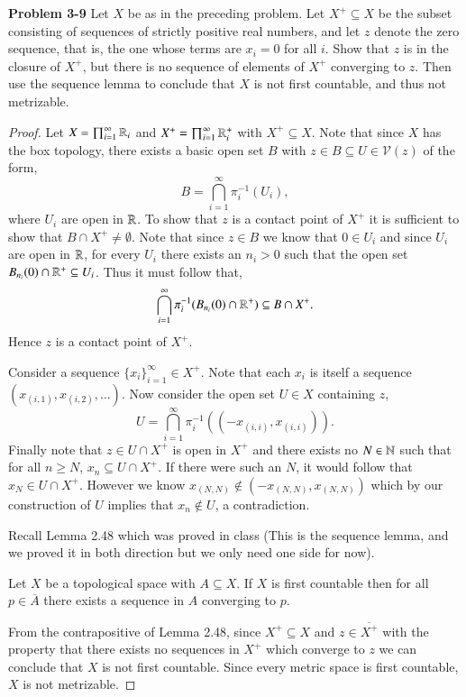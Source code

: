 \documentclass[minion]{homework651}
\begin{document}
\begin{problems}
\problem\textbf{Problem 3-9} Let $X$ be as in the preceding problem. Let $X^+\subseteq X$ be the subset consisting of sequences of 
strictly positive real numbers, and let $z$ denote the zero sequence, that is, the one whose terms are $x_i = 0$ for all $i$. 
Show that $z$ is in the closure of $X^+$, but there is no sequence of elements of $X^+$ converging to $z$. Then use the sequence lemma to conclude that $X$
is not first countable, and thus not metrizable.  
\begin{proof}  Let $X = \prod_{i = 1}^\infty \mathbb R_i$ and $X^+ = \prod_{i = 1}^\infty \mathbb R^+_i$ with $X^+\subseteq X$. Note that since $X$ has the box topology,
    there exists a basic open set $B$ with $z \in B \subseteq U \in \mathcal{V}(z)$ of the form, 
    \begin{equation*}
        B = \bigcap_{i = 1}^\infty \pi^{-1}_i(U_i),
    \end{equation*}
    where $U_i$ are open in $\mathbb R$. To show that $z$ is a contact point of $X^+$ it is sufficient to show that $B \cap X^+ \neq \emptyset$. 
    Note that since $z \in B$ we know that $0 \in U_i$ and since $U_i$ are open in $\mathbb R$, for every $U_i$ there exists an $n_{i} > 0$ such that the open set $B_{n_{i}}(0)\cap \mathbb R^+ \subseteq U_i$.
    Thus it must follow that, 
    \begin{equation*}
        \bigcap_{i = 1}^{\infty}\pi^{-1}_i(B_{n_i}(0) \cap \mathbb R^+) \subseteq B \cap X^+.
    \end{equation*}
    Hence $z$ is a contact point of $X^+$. 

    
    Consider a sequence $\{x_i\}_{i = 1}^\infty \in X^+$. Note that each $x_i$ is itself a sequence $(x_{(i,1)},x_{(i,2)}, \dots)$.
    Now consider the open set $U \in X$ containing $z$, 
    \begin{equation*}
        U = \bigcap_{i = 1}^{\infty}\pi_i^{-1}((-x_{(i,i)}, x_{(i,i)})).
    \end{equation*}
    Finally note that $z \in U \cap X^+$ is open in $X^+$ and there exists no $N \in \mathbb N$ such that for all $n \geq N$, $x_n \subseteq U\cap X^+$. 
    If there were such an $N$, it would follow that $x_N \in U \cap X^+$. However we know $x_{(N, N)} \not\in (-x_{(N, N)}, x_{(N, N)})$ which by our construction of $U$ implies that 
    $x_n \not \in U$, a contradiction.  

    Recall Lemma 2.48 which was proved in class (This is the sequence lemma, and we proved it in both direction but we only need one side for now). 
    \begin{lemma}{2.48} Let $X$ be a topological space with $A \subseteq X$. If $X$ is first countable then for all $p \in \overline{A}$ there exists a sequence in $A$ converging to $p$. 
    \end{lemma}
    From the contrapositive of Lemma 2.48, since $X^+ \subseteq X$ and $z \in \overline{X^+}$ with the property that there exists no sequences in $X^+$ which converge to $z$ we can conclude that $X$ is not first countable.
    Since every metric space is first countable, $X$ is not metrizable. 



\end{proof}
\end{problems}
\end{document}
